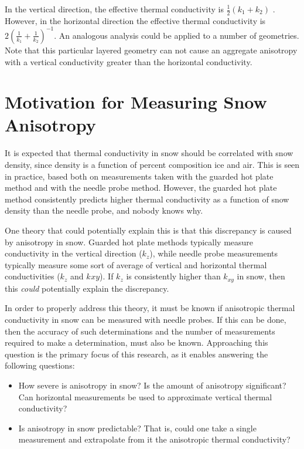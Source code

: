 In the vertical direction, the effective thermal conductivity is
\(\frac12(k_1 + k_2)\) \cite{lunardini}. However, in the horizontal direction the effective
thermal conductivity is \(2\left( \frac1{k_1} + \frac1{k_2} \right)^{-1}\). An
analogous analysis could be applied to a number of geometries. Note that this
particular layered geometry can not cause an aggregate anisotropy with a
vertical conductivity greater than the horizontal conductivity.


\section{Motivation for Measuring Snow Anisotropy}

It is expected that thermal conductivity in snow should be correlated with snow
density, since density is a function of percent composition ice and air.
\cite{pitman} This is seen in practice, based both on measurements taken with
the guarded hot plate method and with the needle probe method. However, the
guarded hot plate method consistently predicts higher thermal conductivity as a
function of snow density than the needle probe, and nobody knows why.

One theory that could potentially explain this is that this discrepancy is
caused by anisotropy in snow.  Guarded hot plate methods typically measure
conductivity in the vertical direction (\(k_z\)), while needle probe
measurements typically measure some sort of average of vertical and horizontal
thermal conductivities (\(k_z\) and \(k_{}xy\)). If \(k_z\) is consistently
higher than \(k_{xy}\) in snow, then this \emph{could} potentially explain
the discrepancy.

In order to properly address this theory, it must be known if anisotropic
thermal conductivity in snow can be measured with needle probes. If this can be
done, then the accuracy of such determinations and the number of measurements
required to make a determination, must also be known. Approaching this question
is the primary focus of this research, as it enables answering the following
questions:

\begin{itemize}
\item How severe is anisotropy in snow? Is the amount of anisotropy
significant? Can horizontal measurements be used to approximate vertical thermal
conductivity?
\item Is anisotropy in snow predictable? That is, could one take a single
measurement and extrapolate from it the anisotropic thermal conductivity?
\end{itemize}


